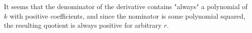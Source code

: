 \documentclass[12pt]{article}
\newcommand{\Le}{\left(}
\newcommand{\Ri}{\right)}
\begin{document}
It seems that the denominator of the derivative contains "always" a polynomial of $k$ with positive coefficients, and since the nominator is some polynomial squared, the resulting quotient is always positive for arbitrary $r$.  
%
\end{document}
